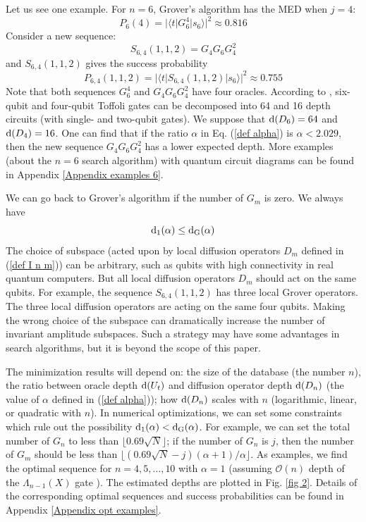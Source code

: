 \documentclass[%
 twocolumn,
 10pt,
 superscriptaddress,
 longbibliography,
 amsmath,amssymb,
 aps,
 pra,
floatfix,
]{revtex4-1}
\begin{document}
Let us see one example. For $n=6$, Grover's algorithm has the MED when $j=4$:
\begin{equation}
  P_6(4) = |\langle t|G_6^4|s_6\rangle|^2\approx 0.816
\end{equation}
Consider a new sequence:
\begin{equation}
    S_{6,4}(1,1,2) = G_4G_6G_4^2
\end{equation}
and $S_{6,4}(1,1,2)$ gives the success probability
\begin{equation}
    P_{6,4}(1,1,2) = |\langle t|S_{6,4}(1,1,2)|s_6\rangle|^2\approx 0.755
\end{equation}
Note that both sequences $G_6^4$ and $G_4G_6G_4^2$ have four oracles. According to \cite{BBCDMSSSW95}, six-qubit and four-qubit Toffoli gates can be decomposed into 64 and 16 depth circuits (with single- and two-qubit gates). We suppose that $\text d(D_6)=64$ and $\text d(D_4)=16$. One can find that if the ratio $\alpha$ in Eq. (\ref{def alpha}) is $\alpha<2.029$, then the new sequence $G_4G_6G_4^2$ has a lower expected depth. More examples (about the $n=6$ search algorithm) with quantum circuit diagrams can be found in Appendix \ref{Appendix examples 6}.

We can go back to Grover's algorithm if the number of $G_m$ is zero. We always have 
\begin{equation}
    \text d_1(\alpha)\leq\text d_\text{G}(\alpha)
\end{equation}
The choice of subspace (acted upon by local diffusion operators $D_m$ defined in (\ref{def I n m})) can be arbitrary, such as qubits with high connectivity in real quantum computers. But all local diffusion operators $D_m$ should act on the same qubits. For example, the sequence $S_{6,4}(1,1,2)$ has three local Grover operators. The three local diffusion operators are acting on the same four qubits. Making the wrong choice of the subspace can dramatically increase the number of invariant amplitude subspaces. Such a strategy may have some advantages in search algorithms, but it is beyond the scope of this paper. 
  
The minimization results will depend on: the size of the database (the number $n$), the ratio between oracle depth $\text d(U_t)$ and diffusion operator depth $\text d(D_n)$ (the value of $\alpha$ defined in (\ref{def alpha})); how $\text d(D_n)$ scales with $n$ (logarithmic, linear, or quadratic with $n$). In numerical optimizations, we can set some constraints which rule out the possibility $\text d_1(\alpha)<\text d_\text{G}(\alpha)$. For example, we can set the total number of $G_n$ to less than $\lfloor0.69\sqrt N\rfloor$; if the number of $G_n$ is $j$, then the number of $G_m$ should be less than $\lfloor(0.69\sqrt N-j)(\alpha+1)/\alpha\rfloor$. As examples, we find the optimal sequence for $n=4,5,\ldots,10$ with $\alpha=1$ (assuming $\mathcal O(n)$ depth of the $\Lambda_{n-1}(X)$ gate \cite{BBCDMSSSW95}). The estimated depths are plotted in Fig. \ref{fig 2}. Details of the corresponding optimal sequences and success probabilities can be found  in Appendix \ref{Appendix opt examples}. 
\end{document}
